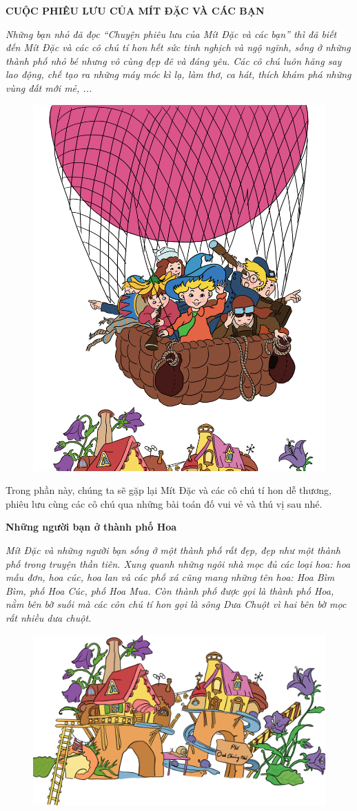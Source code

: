 \graphicspath{{../giaitoancungbi/mitdac/}}
\vspace*{-30pt}
\begin{center}
	\textbf{\color{toancuabi}\Large\color{toancuabi}CUỘC PHIÊU LƯU CỦA MÍT ĐẶC VÀ CÁC BẠN}
\end{center}
	\textit{Những bạn nhỏ đã đọc “Chuyện phiêu lưu của Mít Đặc và các bạn” thì đã biết đến Mít Đặc và các cô chú tí hon hết sức tinh nghịch và ngộ ngĩnh, sống ở những thành phố nhỏ bé nhưng vô cùng đẹp đẽ và đáng yêu. Các cô chú luôn hăng say lao động, chế tạo ra những máy móc kì lạ, làm thơ, ca hát, thích khám phá những vùng đất mới mẻ, ...}
	\begin{figure}[H]
		\centering
		\vspace*{-5pt}
		\captionsetup{labelformat= empty, justification=centering}
		\includegraphics[width=0.4\linewidth]{Hinh0}
		\vspace*{-10pt}
	\end{figure}
	\vskip 0.1cm
	Trong phần này, chúng ta sẽ gặp lại Mít Đặc và các cô chú tí hon dễ thương, phiêu lưu cùng các cô chú qua những bài toán đố vui vẻ và thú vị sau nhé.
	\begin{center}
		\textbf{\color{toancuabi}Những người bạn ở thành phố Hoa}
	\end{center}
	\textit{Mít Đặc và những người bạn sống ở một thành phố rất đẹp, đẹp như một thành phố trong truyện thần tiên. Xung quanh những ngôi nhà mọc đủ các loại hoa: hoa mẫu đơn, hoa cúc, hoa lan và các phố xá cũng mang những tên hoa: Hoa Bìm Bìm, phố Hoa Cúc, phố Hoa Mua. Còn thành phố được gọi là thành phố Hoa, nằm bên bờ suối mà các côn chú tí hon gọi là sông Dưa Chuột vì hai bên bờ mọc rất nhiều dưa chuột.}
	\begin{figure}[H]
		\centering
		\vspace*{-5pt}
		\captionsetup{labelformat= empty, justification=centering}
		\includegraphics[width=0.55\linewidth]{Hinh1_TPHoa}
		\vspace*{-15pt}
	\end{figure}

